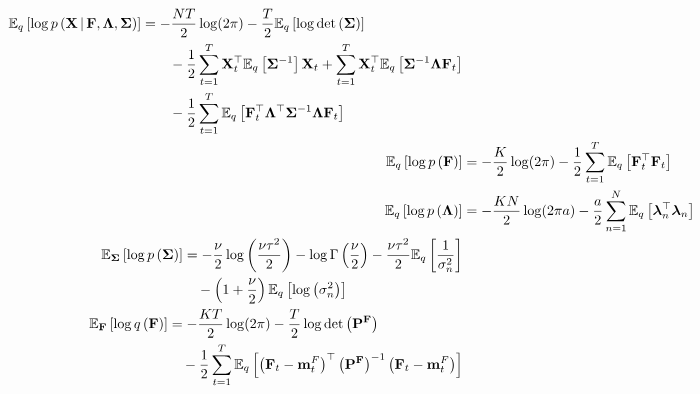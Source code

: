 \begin{align}
	\begin{split}
		\mathbb{E}_q \left[ \log p \left( \bf X \,|\, F, {\bm \Lambda}, {\bm \Sigma} \right) \right] 
			&= - \frac{NT}{2} \log (2\pi) - \frac{T}{2} \mathbb{E}_q \left[ \log \det \left( \bm \Sigma \right) \right] \\
			&\hspace{2em}- \frac{1}{2} \sum_{t=1}^T {\bf X}_t^{\top} \mathbb{E}_q \left[ \bm \Sigma^{-1} \right] {\bf X}_t + \sum_{t=1}^T {\bf X}_t^{\top} \mathbb{E}_q \left[ {\bm \Sigma}^{-1} {\bm \Lambda} {\bf F}_t \right] \\
			&\hspace{2em}- \frac{1}{2} \sum_{t=1}^T \mathbb{E}_q \left[ {\bf F}_t^{\top} {\bm \Lambda}^{\top} {\bm \Sigma}^{-1} {\bm \Lambda} {\bf F}_t \right]
	\end{split} \\
	\mathbb{E}_q \left[ \log p \left( {\bf F} \right) \right] &= - \frac{K}{2} \log (2\pi) - \frac{1}{2} \sum_{t=1}^T \mathbb{E}_q \left[ {\bf F}_t^{\top} {\bf F}_t \right] \\
	\mathbb{E}_q \left[ \log p \left( {\bm \Lambda} \right) \right] &= - \frac{KN}{2} \log (2\pi a) - \frac{a}{2} \sum_{n=1}^N \mathbb{E}_q \left[ {\bm \lambda}_n^{\top} {\bm \lambda}_n \right] \\
	\begin{split}
		\mathbb{E}_{\bm \Sigma} \left[ \log p \left( \bm \Sigma \right) \right] 
			&= - \frac{\nu}{2} \log \left( \frac{\nu \tau^2}{2} \right) - \log \Gamma \left( \frac{\nu}{2} \right) - \frac{\nu \tau^2}{2} \mathbb{E}_q \left[ \frac{1}{\sigma_n^2} \right] \\
			&\hspace{1em}- \left( 1 + \frac{\nu}{2} \right) \mathbb{E}_q \left[ \log \left( \sigma_n^2 \right) \right]	
	\end{split} \\
	\begin{split}
		\mathbb{E}_{\bf F} \left[ \log q \left( {\bf F} \right) \right] &= - \frac{KT}{2} \log(2\pi) - \frac{T}{2} \log \det \left({\bf P^F} \right) \\
		&\hspace{1em}- \frac{1}{2} \sum_{t=1}^T \mathbb{E}_q \left[ \left( {\bf F}_t - {\bf m}_t^F \right)^{\top} \left( {\bf P}^{\bf F} \right)^{-1} \left( {\bf F}_t - {\bf m}_t^F \right) \right]
	\end{split} \\
	\begin{split}

\end{split}
\end{align}
